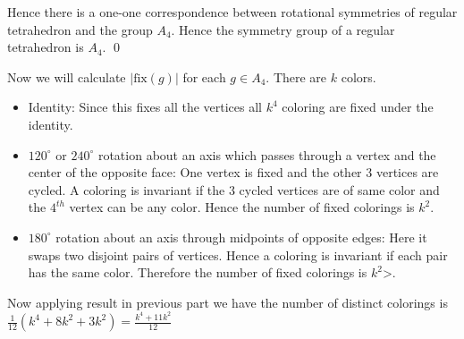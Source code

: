 \documentclass[a4paper, 11pt]{article}
\renewenvironment{proof}{\noindent{\it \textbf{Proof:}}\hspace*{1em}}{\hfill\qed\bigskip\\}
\begin{document}
{\begin{itemize}
\begin{proof}
	Hence there is a one-one correspondence between rotational symmetries of regular tetrahedron and the group $A_4$. Hence the symmetry group of a regular tetrahedron is $A_4$.  
\end{proof}

Now we will calculate $|\text{fix}(g)|$ for each $g\in A_4$. There are $k$ colors.
\begin{itemize}
	\item Identity: Since this fixes all the vertices all $k^4$ coloring are fixed under the identity.
	\item $120^{\circ}$ or $240^{\circ}$ rotation about an axis which passes through a vertex and the center of the opposite face: One vertex is fixed and the other 3 vertices are cycled. A coloring is invariant if the 3 cycled vertices are of same color and the $4^{th}$ vertex can be any color. Hence the number of fixed colorings is $k^2$.
	\item $180^{\circ}$ rotation about an axis through midpoints of opposite edges: Here it swaps two disjoint pairs of vertices. Hence a coloring is invariant if each pair has the same color. Therefore the number of fixed colorings is $k^2$>.
\end{itemize}

Now applying result in previous part we have the number of distinct colorings is $\frac1{12}(k^4+8k^2+3k^2)=\frac{k^4+11k^2}{12}$
\end{itemize}
}
\end{document}
